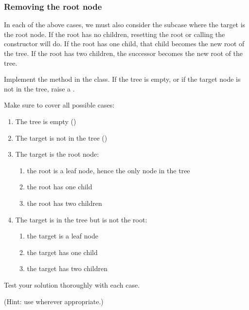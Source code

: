 \subsubsection*{Removing the root node}

In each of the above cases, we must also consider the subcase where the target is the root node.
If the root has no children, resetting the root or calling the constructor will do.
If the root has one child, that child becomes the new root of the tree.
If the root has two children, the successor becomes the new root of the tree.

\begin{problem}
Implement the  method in the  class.
If the tree is empty, or if the target node is not in the tree, raise a .

Make sure to cover all possible cases:
\begin{enumerate}
\item The tree is empty ()
\item The target is not in the tree ()
\item The target is the root node:
	\begin{enumerate}
	\item{the root is a leaf node, hence the only node in the tree}
	\item{the root has one child}
	\item{the root has two children}
	\end{enumerate}
\item The target is in the tree but is not the root:
	\begin{enumerate}
	\item{the target is a leaf node}
	\item{the target has one child}
	\item{the target has two children}
	\end{enumerate}
\end{enumerate}
Test your solution thoroughly with each case.

(Hint: use  wherever appropriate.)
\end{problem}

